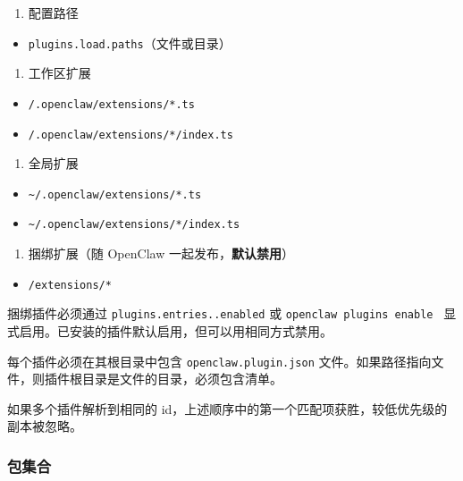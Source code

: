 \begin{enumerate}
  \item 配置路径
\end{enumerate}


\begin{itemize}
  \item \texttt{plugins.load.paths}（文件或目录）
\end{itemize}


\begin{enumerate}
  \item 工作区扩展
\end{enumerate}


\begin{itemize}
  \item \texttt{/.openclaw/extensions/*.ts}
  \item \texttt{/.openclaw/extensions/*/index.ts}
\end{itemize}


\begin{enumerate}
  \item 全局扩展
\end{enumerate}


\begin{itemize}
  \item \texttt{\textasciitilde{}/.openclaw/extensions/*.ts}
  \item \texttt{\textasciitilde{}/.openclaw/extensions/*/index.ts}
\end{itemize}


\begin{enumerate}
  \item 捆绑扩展（随 OpenClaw 一起发布，\textbf{默认禁用}）
\end{enumerate}


\begin{itemize}
  \item \texttt{/extensions/*}
\end{itemize}


捆绑插件必须通过 \texttt{plugins.entries..enabled} 或 \texttt{openclaw plugins enable } 显式启用。已安装的插件默认启用，但可以用相同方式禁用。

每个插件必须在其根目录中包含 \texttt{openclaw.plugin.json} 文件。如果路径指向文件，则插件根目录是文件的目录，必须包含清单。

如果多个插件解析到相同的 id，上述顺序中的第一个匹配项获胜，较低优先级的副本被忽略。

\subsubsection{包集合}


